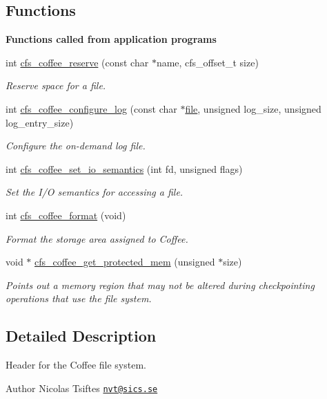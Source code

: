 \subsection*{Functions}
\begin{Indent}{\bf Functions called from application programs}\par
\begin{DoxyCompactItemize}
\item 
int \hyperlink{group__cfs_ga2586fe834b8b6e943c5e116919edb357}{cfs\+\_\+coffee\+\_\+reserve} (const char $\ast$name, cfs\+\_\+offset\+\_\+t size)
\begin{DoxyCompactList}\small\item\em Reserve space for a file. \end{DoxyCompactList}\item 
int \hyperlink{group__cfs_ga00f5e8bad702aa74e5c14fc6f60064c8}{cfs\+\_\+coffee\+\_\+configure\+\_\+log} (const char $\ast$\hyperlink{structfile}{file}, unsigned log\+\_\+size, unsigned log\+\_\+entry\+\_\+size)
\begin{DoxyCompactList}\small\item\em Configure the on-\/demand log file. \end{DoxyCompactList}\item 
int \hyperlink{group__cfs_gacc3d4dd048dae3848693c7b175539110}{cfs\+\_\+coffee\+\_\+set\+\_\+io\+\_\+semantics} (int fd, unsigned flags)
\begin{DoxyCompactList}\small\item\em Set the I/\+O semantics for accessing a file. \end{DoxyCompactList}\item 
int \hyperlink{group__cfs_ga20f73caab6f11eebc05378fe9d4606b3}{cfs\+\_\+coffee\+\_\+format} (void)
\begin{DoxyCompactList}\small\item\em Format the storage area assigned to Coffee. \end{DoxyCompactList}\item 
void $\ast$ \hyperlink{group__cfs_gae4e97787746c7040c54f5adf60d4709b}{cfs\+\_\+coffee\+\_\+get\+\_\+protected\+\_\+mem} (unsigned $\ast$size)
\begin{DoxyCompactList}\small\item\em Points out a memory region that may not be altered during checkpointing operations that use the file system. \end{DoxyCompactList}\end{DoxyCompactItemize}
\end{Indent}


\subsection{Detailed Description}
Header for the Coffee file system. \begin{DoxyAuthor}{Author}
Nicolas Tsiftes \href{mailto:nvt@sics.se}{\tt nvt@sics.\+se} 
\end{DoxyAuthor}
